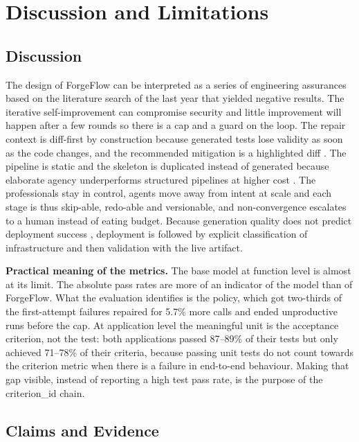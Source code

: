 \documentclass[pdflatex,sn-mathphys-num]{sn-jnl}%
\theoremstyle{thmstyleone}%
\theoremstyle{thmstyletwo}%
\theoremstyle{thmstylethree}%
\begin{document}
\section{Discussion and Limitations}\label{sec9}

\subsection{Discussion}\label{sec9.1}

The design of ForgeFlow can be interpreted as a series of engineering assurances based on the literature search of the last year that yielded negative results. The iterative self-improvement can compromise security \cite{r05shukla} and little improvement will happen after a few rounds \cite{r09kiecker,r10arimbur} so there is a cap and a guard on the loop. The repair context is diff-first by construction because generated tests lose validity as soon as the code changes, and the recommended mitigation is a highlighted diff \cite{r11haroon}. The pipeline is static and the skeleton is duplicated instead of generated because elaborate agency underperforms structured pipelines at higher cost \cite{r13xia}. The professionals stay in control, agents move away from intent at scale \cite{r07tang,r08huang} and each stage is thus skip-able, redo-able and versionable, and non-convergence escalates to a human instead of eating budget. Because generation quality does not predict deployment success \cite{r06zhang}, deployment is followed by explicit classification of infrastructure and then validation with the live artifact.

\textbf{Practical meaning of the metrics.} The base model at function level is almost at its limit. The absolute pass rates are more of an indicator of the model than of ForgeFlow. What the evaluation identifies is the policy, which got two-thirds of the first-attempt failures repaired for 5.7\% more calls and ended unproductive runs before the cap. At application level the meaningful unit is the acceptance criterion, not the test: both applications passed 87--89\% of their tests but only achieved 71--78\% of their criteria, because passing unit tests do not count towards the criterion metric when there is a failure in end-to-end behaviour. Making that gap visible, instead of reporting a high test pass rate, is the purpose of the criterion\_id chain.

\subsection{Claims and Evidence}\label{sec9.2}
\end{document}
